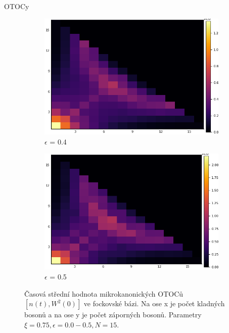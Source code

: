 \documentclass{article}
\begin{document}
\begin{section}{OTOCy}
\begin{figure}[H]
\begin{subfigure}{.33\textwidth}
                                        \centering
                                        \includegraphics[width=1.0\linewidth]{nW0.4.png}
                                      \caption{$\epsilon$ = 0.4}
                                      \end{subfigure}

                                      \begin{subfigure}{.33\textwidth}
                                        \centering
                                        \includegraphics[width=1.0\linewidth]{nW0.5.png}
                                      \caption{$\epsilon$ = 0.5}
                 
                                      \end{subfigure}%
                                   

        
        
                                    \caption{Časová střední hodnota mikrokanonických OTOCů $[n(t),W^2(0)]$ ve fockovské bázi. Na ose x je počet kladných bosonů a na 
                                    ose y je počet záporných bosonů. Parametry $\xi = 0.75, \epsilon = 0.0 - 0.5, N = 15$.}
                                    \end{figure}

\end{section}


     
\end{document}
